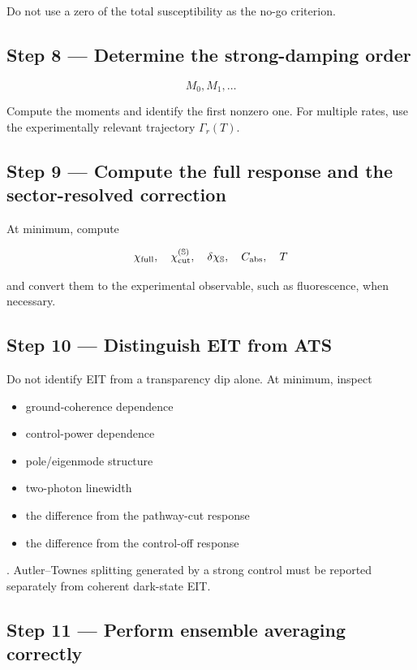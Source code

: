 \documentclass[
  10pt,
  a4paper,
]{article}
\providecommand{\tightlist}{%
  \setlength{\itemsep}{0pt}\setlength{\parskip}{0pt}}
\begin{document}
Do not use a zero of the total susceptibility as the no-go criterion.

\subsection{Step 8 --- Determine the strong-damping
order}\label{step-8-determine-the-strong-damping-order}

\[
M_0,M_1,\ldots
\]

Compute the moments and identify the first nonzero one. For multiple
rates, use the experimentally relevant trajectory \(\Gamma_r(T)\).

\subsection{Step 9 --- Compute the full response and the sector-resolved
correction}\label{step-9-compute-the-full-response-and-the-sector-resolved-correction}

At minimum, compute

\[
\chi_{\rm full},
\quad
\chi_{\rm cut}^{(\mathbb S)},
\quad
\delta\chi_{\mathbb S},
\quad
C_{\rm abs},
\quad
T
\]

and convert them to the experimental observable, such as fluorescence,
when necessary.

\subsection{Step 10 --- Distinguish EIT from
ATS}\label{step-10-distinguish-eit-from-ats}

Do not identify EIT from a transparency dip alone. At minimum, inspect

\begin{itemize}
\tightlist
\item
  ground-coherence dependence
\item
  control-power dependence
\item
  pole/eigenmode structure
\item
  two-photon linewidth
\item
  the difference from the pathway-cut response
\item
  the difference from the control-off response
\end{itemize}

. Autler--Townes splitting generated by a strong control must be
reported separately from coherent dark-state EIT.

\subsection{Step 11 --- Perform ensemble averaging
correctly}\label{step-11-perform-ensemble-averaging-correctly}
\end{document}
